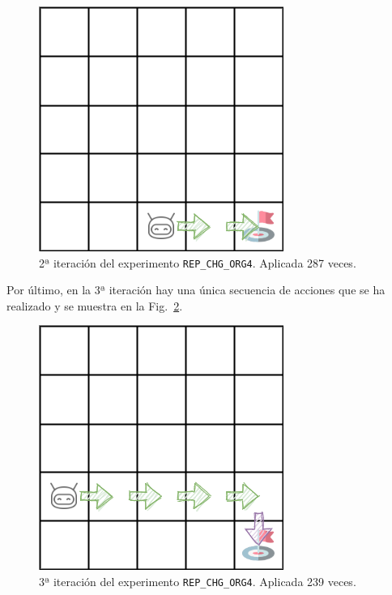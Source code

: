 \begin{figure}
    \centering
    \includegraphics[scale=0.4]{cap5_experimentacion/images/dim5_CHANGE_ORIGIN-20-09_00-42-50.png}
    \caption{2ª iteración del experimento \texttt{REP\_CHG\_ORG4}. Aplicada 287 veces.}
    \label{fig:dim5_CHANGE_ORIGIN-20_09-00_52-2, 0, 1_2iter}
\end{figure}

Por último, en la 3ª iteración hay una única secuencia de acciones que se ha realizado y se muestra en la  Fig.~\ref{fig:dim5_CHANGE_ORIGIN-20_09-00_52-2, 0, 1_3iter}.\\

\begin{figure}
    \centering
    \includegraphics[scale=0.4]{cap5_experimentacion/images/dim5_CHANGE_ORIGIN-20_09-00_52-1, 0, 2_139.png}
    \caption{3ª iteración del experimento \texttt{REP\_CHG\_ORG4}. Aplicada 239 veces.}
    \label{fig:dim5_CHANGE_ORIGIN-20_09-00_52-2, 0, 1_3iter}
\end{figure}

